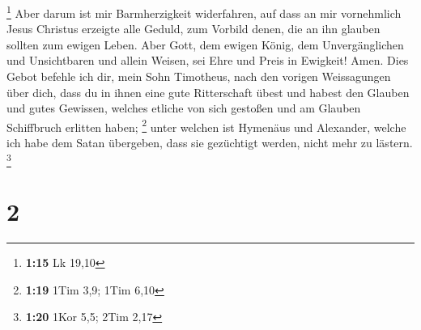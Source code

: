 \footnote{\textbf{1:15} Lk 19,10}  Aber darum ist mir
Barmherzigkeit widerfahren, auf dass an mir vornehmlich Jesus Christus
erzeigte alle Geduld, zum Vorbild denen, die an ihn glauben sollten zum
ewigen Leben.  Aber Gott, dem ewigen König, dem
Unvergänglichen und Unsichtbaren und allein Weisen, sei Ehre und Preis
in Ewigkeit! Amen.  Dies Gebot befehle ich dir, mein Sohn
Timotheus, nach den vorigen Weissagungen über dich, dass du in ihnen
eine gute Ritterschaft übest  und habest den Glauben und
gutes Gewissen, welches etliche von sich gestoßen und am Glauben
Schiffbruch erlitten haben; \footnote{\textbf{1:19} 1Tim 3,9; 1Tim 6,10}
 unter welchen ist Hymenäus und Alexander, welche ich
habe dem Satan übergeben, dass sie gezüchtigt werden, nicht mehr zu
lästern. \footnote{\textbf{1:20} 1Kor 5,5; 2Tim 2,17}

\hypertarget{section-1}{%
\section{2}\label{section-1}}

